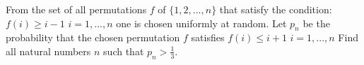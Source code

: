 From the set of all permutations $f$ of $\{1, 2, ... , n\}$ that satisfy the condition:
$f(i) \geq i-1$ $i=1,...,n$
one is chosen uniformly at random. Let $p_n$ be the probability that the chosen permutation $f$ satisfies
$f(i) \leq i+1$ $i=1,...,n$
Find all natural numbers $n$ such that $p_n > \frac{1}{3}$.
